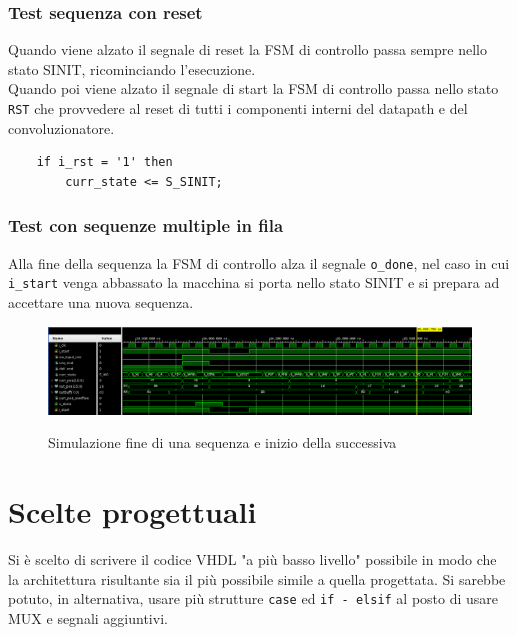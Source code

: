 \documentclass[12pt, a4paper]{article}
\begin{document}
\vspace{10cm}

\subsubsection{Test sequenza con reset}

Quando viene alzato il segnale di reset la FSM di controllo passa sempre nello stato SINIT, ricominciando l'esecuzione.\\
\noindent Quando poi viene alzato il segnale di start la FSM di controllo passa nello stato \texttt{RST}
che provvedere al reset di tutti i componenti interni del datapath e del convoluzionatore.

\begin{verbatim}
    if i_rst = '1' then
        curr_state <= S_SINIT;
\end{verbatim}

\subsubsection{Test con sequenze multiple in fila}

Alla fine della sequenza la FSM di controllo alza il segnale \texttt{o\_done}, nel caso in cui \texttt{i\_start} venga abbassato
la macchina si porta nello stato SINIT e si prepara ad accettare una nuova sequenza.

\begin{figure}[h!]
    \centering
    \includegraphics[scale=0.3]{sim_mult_seq.png}
    \label{img:sim_multseq_change}
    \caption{Simulazione fine di una sequenza e inizio della successiva}
\end{figure}

\section{Scelte progettuali}

Si è scelto di scrivere il codice VHDL "a più basso livello" possibile in modo
che la architettura risultante sia il più possibile simile a quella progettata.
Si sarebbe potuto, in alternativa, usare più strutture \texttt{case} ed \texttt{if - elsif} 
al posto di usare MUX e segnali aggiuntivi.
\end{document}
